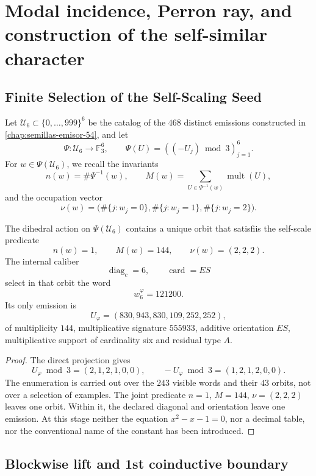 \section{Modal incidence, Perron ray, and construction of the self-similar character}
\label{p12-83-c9-s3:chap:biografia-completa-phi}

\subsection{Finite Selection of the Self-Scaling Seed}

Let \(\mathcal U_6\subset\{0,\ldots,999\}^6\) be the catalog of the
\(468\) distinct emissions constructed in
\cref{chap:semillas-emisor-54}, and let
\[
 \Psi:\mathcal U_6\longrightarrow\mathbb F_3^6,
 \qquad
 \Psi(U)=((-U_j)\bmod3)_{j=1}^{6}.
\]
For \(w\in\Psi(\mathcal U_6)\), we recall the invariants
\[
 n(w)=\#\Psi^{-1}(w),
 \qquad
 M(w)=\sum_{U\in\Psi^{-1}(w)}\operatorname{mult}(U),
\]
and the occupation vector
\[
 \nu(w)=
 \bigl(\#\{j:w_j=0\},\#\{j:w_j=1\},\#\{j:w_j=2\}\bigr).
\]

\begin{theorem}
\label{p12-83-c9-s3:thm:seleccion-orbital-phi}
The dihedral action on \(\Psi(\mathcal U_6)\) contains a unique orbit
that satisfiis the self-scale predicate
\[
 n(w)=1,
 \qquad
 M(w)=144,
 \qquad
 \nu(w)=(2,2,2).
\]
The internal caliber
\[
 \operatorname{diag}_c=6,
 \qquad
 \operatorname{card}=ES
\]
select in that orbit the word
\[
 \boxed{w_6^{\varphi}=121200.}
\]
Its only emission is
\[
 \boxed{U_{\varphi}=(830,943,830,109,252,252),}
\]
of multiplicity \(144\), multiplicative signature \(555933\), additive
orientation \(ES\), multiplicative support of cardinality six and residual type
\(A\).
\end{theorem}

\begin{proof}
The direct projection gives
\[
 U_{\varphi}\bmod3=(2,1,2,1,0,0),
 \qquad
 -U_{\varphi}\bmod3=(1,2,1,2,0,0).
\]
The enumeration is carried out over the \(243\) visible words and their
\(43\) orbits, not over a selection of examples. The joint predicate
\(n=1\), \(M=144\), \(\nu=(2,2,2)\) leaves one orbit. Within it, the
declared diagonal and orientation leave one emission. At this stage neither
the equation \(x^2-x-1=0\), nor a decimal table, nor the
conventional name of the constant has been introduced.
\end{proof}

\subsection{Blockwise lift and 1st coinductive boundary}

